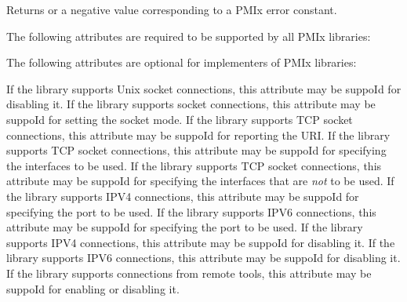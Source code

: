 \begin{arglist}
\end{arglist}

Returns  or a negative value corresponding to a PMIx error constant.

\reqattrstart
The following attributes are required to be supported by all \ac{PMIx} libraries:


\reqattrend


\optattrstart
The following attributes are optional for implementers of \ac{PMIx} libraries:

 If the library supports Unix socket connections, this attribute may be suppoId for disabling it.
\pastePRIAttributeItemEnd{}
 If the library supports socket connections, this attribute may be suppoId for setting the socket mode.
\pasteAttributeItemEnd{}
 If the library supports TCP socket connections, this attribute may be suppoId for reporting the URI.
\pastePRIAttributeItemEnd{}
 If the library supports TCP socket connections, this attribute may be suppoId for specifying the interfaces to be used.
\pastePRIAttributeItemEnd{}
 If the library supports TCP socket connections, this attribute may be suppoId for specifying the interfaces that are \textit{not} to be used.
\pastePRIAttributeItemEnd{}
 If the library supports IPV4 connections, this attribute may be suppoId for specifying the port to be used.
\pastePRIAttributeItemEnd{}
 If the library supports IPV6 connections, this attribute may be suppoId for specifying the port to be used.
\pastePRIAttributeItemEnd{}
 If the library supports IPV4 connections, this attribute may be suppoId for disabling it.
\pastePRIAttributeItemEnd{}
 If the library supports IPV6 connections, this attribute may be suppoId for disabling it.
\pastePRIAttributeItemEnd{}
 If the library supports connections from remote tools, this attribute may be suppoId for enabling or disabling it.
\pastePRIAttributeItemEnd{}

